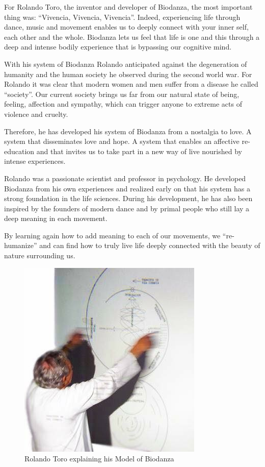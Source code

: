 \documentclass[
  11pt,
]{book}
\begin{document}
For Rolando Toro, the inventor and developer of Biodanza, the most important thing was: ``Vivencia, Vivencia, Vivencia''. Indeed, experiencing life through dance, music and movement enables us to deeply connect with your inner self, each other and the whole. Biodanza lets us feel that life is one and this through a deep and intense bodily experience that is bypassing our cognitive mind.

With his system of Biodanza Rolando anticipated against the degeneration of humanity and the human society he observed during the second world war. For Rolando it was clear that modern women and men suffer from a disease he called ``society''. Our current society brings us far from our natural state of being, feeling, affection and sympathy, which can trigger anyone to extreme acts of violence and cruelty.

Therefore, he has developed his system of Biodanza from a nostalgia to love. A system that disseminates love and hope. A system that enables an affective re-education and that invites us to take part in a new way of live nourished by intense experiences.

Rolando was a passionate scientist and professor in psychology. He developed Biodanza from his own experiences and realized early on that his system has a strong foundation in the life sciences. During his development, he has also been inspired by the founders of modern dance and by primal people who still lay a deep meaning in each movement.

By learning again how to add meaning to each of our movements, we ``re-humanize'' and can find how to truly live life deeply connected with the beauty of nature surrounding us.

\begin{figure}

{\centering \includegraphics[width=0.45\linewidth]{./figs/rolandoAndModel} 

}

\caption{Rolando Toro explaining his Model of Biodanza}\label{fig:rolandoModel}
\end{figure}
\end{document}

